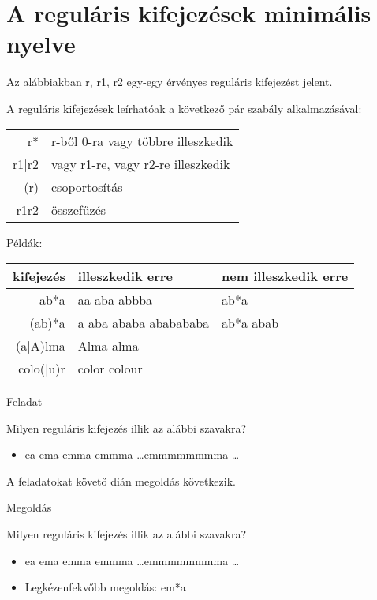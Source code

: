 \documentclass[
    ignorenonframetext
    ]{beamer}
\begin{document}
\section{A reguláris kifejezések minimális nyelve}

\begin{frame}
    Az alábbiakban r, r1, r2 egy-egy érvényes reguláris kifejezést jelent.

    A reguláris kifejezések leírhatóak a következő pár szabály
    alkalmazásával:

    \vfill
    \begin{tabular}{rl}
        r* & r-ből 0-ra vagy többre illeszkedik\\
        r1|r2 & vagy r1-re, vagy r2-re illeszkedik\\
        (r) & csoportosítás\\
        r1r2 & összefűzés\\
    \end{tabular}

    \vfill
    Példák:\\
    \begin{tabular}{rll}
        kifejezés & illeszkedik erre & nem illeszkedik erre\\
        \hline
        ab*a & aa aba abbba & ab*a\\
        (ab)*a & a aba ababa ababababa & ab*a abab\\
        (a|A)lma & Alma alma & \\
        colo(|u)r & color colour& \\
    \end{tabular}
\end{frame}

\begin{frame}
    {Feladat}

    Milyen reguláris kifejezés illik az alábbi szavakra?

    \begin{itemize}
        \item ea ema emma emmma \ldots emmmmmmmma \ldots
    \end{itemize}

    A feladatokat követő dián megoldás következik.
\end{frame}

\begin{frame}
    {Megoldás}

    Milyen reguláris kifejezés illik az alábbi szavakra?

    \begin{itemize}
        \item ea ema emma emmma \ldots emmmmmmmma \ldots
	\item Legkézenfekvőbb megoldás: em*a
    \end{itemize}
\end{frame}
\end{document}
